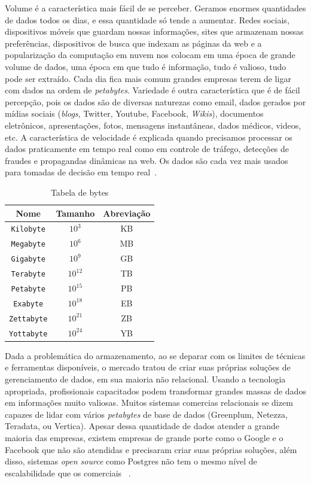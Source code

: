 Volume é a característica mais fácil de se perceber. Geramos enormes quantidades de dados todos os dias, e essa quantidade só tende a aumentar. Redes sociais, dispositivos móveis que guardam nossas informações, sites que armazenam nossas preferências, dispositivos de busca que indexam as páginas da web e a popularização da computação em nuvem nos colocam em uma época de grande volume de dados, uma época em que tudo é informação, tudo é valioso, tudo pode ser extraído. Cada dia fica mais comum grandes empresas terem de ligar com dados na ordem de \textit{petabytes}. Variedade é outra característica que é de fácil percepção, pois os dados são de diversas naturezas como email, dados gerados por mídias sociais (\textit{blogs}, Twitter, Youtube, Facebook, \textit{Wikis}), documentos eletrônicos, apresentações, fotos, mensagens instantâneas, dados médicos, videos, etc. A característica de velocidade é explicada quando precisamos processar os dados praticamente em tempo real como em controle de tráfego, detecções de fraudes e propagandas dinâmicas na web. Os dados são cada vez mais usados para tomadas de decisão em tempo real~\cite{promiseperil}.

\begin{table}
	\caption{Tabela de bytes}
	\begin{center}
	\begin{tabular}{ccc}
		\hline
			\textbf{Nome} & \textbf{Tamanho} & \textbf{Abreviação} \\
		\hline
			\texttt{Kilobyte}	& $10^3$ & KB \\
			\texttt{Megabyte}	& $10^6$ & MB \\
			\texttt{Gigabyte}	& $10^9$ & GB \\
			\texttt{Terabyte}	& $10^{12}$ & TB \\
			\texttt{Petabyte}	& $10^{15}$ & PB \\
			\texttt{Exabyte}	& $10^{18}$ & EB \\
			\texttt{Zettabyte}	& $10^{21}$ & ZB \\
			\texttt{Yottabyte}	& $10^{24}$ & YB \\
		\hline
	\end {tabular}
	\end{center}
	\label{tab:bytes}
\end{table}

Dada a problemática do armazenamento, ao se deparar com os limites de técnicas e ferramentas disponíveis, o mercado tratou de criar suas próprias soluções de gerenciamento de dados, em sua maioria não relacional. Usando a tecnologia apropriada, profissionais capacitados podem transformar grandes massas de dados em informações muito valiosas. Muitos sistemas comercias relacionais se dizem capazes de lidar com vários \textit{petabytes} de base de dados (Greenplum, Netezza, Teradata, ou Vertica). Apesar dessa quantidade de dados atender a grande maioria das empresas, existem empresas de grande porte como o Google e o Facebook que não são atendidas e precisaram criar suas próprias soluções, além disso, sistemas \textit{open source} como Postgres  não tem o mesmo nível de escalabilidade que os comerciais ~\cite{fromdbtobigdata}.


